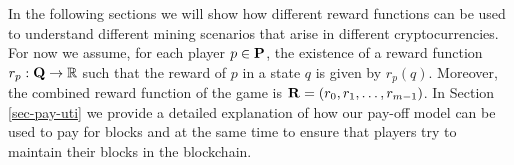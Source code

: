 In the following sections we will show how different reward functions can be used to understand different mining scenarios that arise in different cryptocurrencies. 
For now we assume, for each player $p \in \mathbf{P}$, the existence of a reward function $r_p : \mathbf{Q} \to \mathbb{R}$ such that the reward of $p$ in a state $q$ is given by $r_p(q)$. Moreover, the combined reward function of the game is $\mathbf{R} = (r_0, r_1, \ldots, r_{m-1})$. In Section \ref{sec-pay-uti} we provide a detailed explanation of how our pay-off model can be used to pay for blocks and at the same time to ensure that players try to maintain their blocks in the blockchain.







